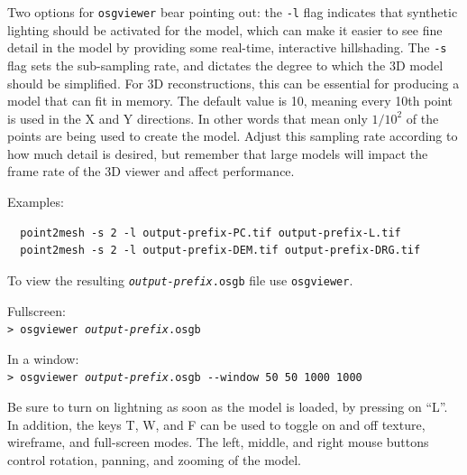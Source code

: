 Two options for \texttt{osgviewer} bear pointing out: the \texttt{-l}
flag indicates that synthetic lighting should be activated for the
model, which can make it easier to see fine detail in the model by
providing some real-time, interactive hillshading.  The \verb#-s#
flag sets the sub-sampling rate, and dictates the degree to which
the 3D model should be simplified.  For 3D reconstructions, this
can be essential for producing a model that can fit in memory.  The
default value is 10, meaning every 10th point is used in the X and
Y directions. In other words that mean only $1/10^2$ of the points
are being used to create the model. Adjust this sampling rate
according to how much detail is desired, but remember that large
models will impact the frame rate of the 3D viewer and affect
performance.

Examples:
\begin{verbatim}
  point2mesh -s 2 -l output-prefix-PC.tif output-prefix-L.tif
  point2mesh -s 2 -l output-prefix-DEM.tif output-prefix-DRG.tif
\end{verbatim}

To view the resulting \texttt{\textit{output-prefix}.osgb} file use
\texttt{osgviewer}.

\hspace*{2em}Fullscreen:\\
\hspace*{2em}\texttt{> osgviewer \textit{output-prefix}.osgb}

\hspace*{2em}In a window:\\
\hspace*{2em}\texttt{> osgviewer \textit{output-prefix}.osgb -\/-window 50 50 1000 1000}

Be sure to turn on lightning as soon as the model is loaded, by pressing on ``L''.
In addition, the keys T, W, and F can be used to toggle on
and off texture, wireframe, and full-screen modes.  The left, middle, and
right mouse buttons control rotation, panning, and zooming of the
model.

